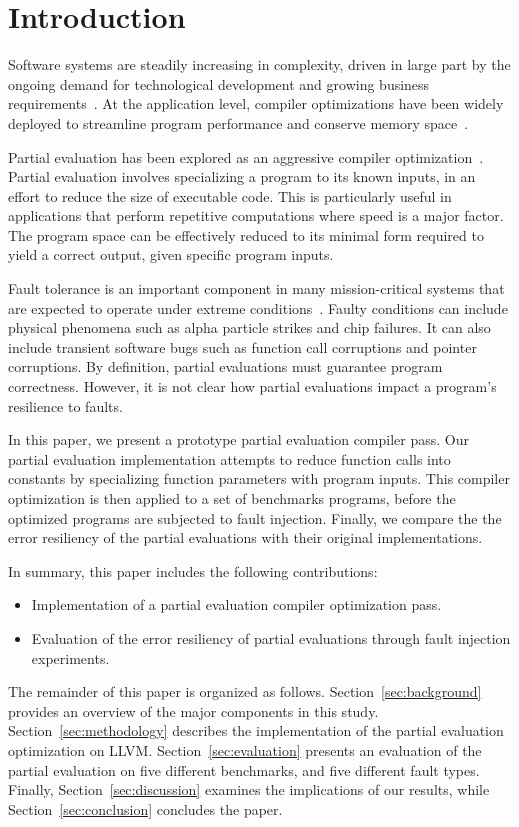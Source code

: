 \section{Introduction}

Software systems are steadily increasing in complexity, driven in large part by the ongoing demand for technological development and growing business requirements~\cite{Lyu}. 
At the application level, compiler optimizations have been widely deployed to streamline program performance and conserve memory space~\cite{Zhou}.

Partial evaluation has been explored as an aggressive compiler optimization~\cite{Jones1993}.
Partial evaluation involves specializing a program to its known inputs, in an effort to reduce the size of executable code. 
This is particularly useful in applications that perform repetitive computations where speed is a major factor.  
The program space can be effectively reduced to its minimal form required to yield a correct output, given specific program inputs.

Fault tolerance is an important component in many mission-critical systems that are expected to operate under extreme conditions~\cite{Somani}.
Faulty conditions can include physical phenomena such as alpha particle strikes and chip failures.
It can also include transient software bugs such as function call corruptions and pointer corruptions. 
By definition, partial evaluations must guarantee program correctness.
However, it is not clear how partial evaluations impact a program's resilience to faults.

In this paper, we present a prototype partial evaluation compiler pass.
Our partial evaluation implementation attempts to reduce function calls into constants by specializing function parameters with program inputs.
This compiler optimization is then applied to a set of benchmarks programs, before the optimized programs are subjected to fault injection.
Finally, we compare the the error resiliency of the partial evaluations with their original implementations.

In summary, this paper includes the following contributions:
\begin{itemize}
\item Implementation of a partial evaluation compiler optimization pass. 
\item Evaluation of the error resiliency of partial evaluations through fault injection experiments.
\end{itemize}

The remainder of this paper is organized as follows.
Section~\ref{sec:background} provides an overview of the major components in this study.
Section~\ref{sec:methodology} describes the implementation of the partial evaluation optimization on LLVM.
Section~\ref{sec:evaluation} presents an evaluation of the partial evaluation on five different benchmarks, and five different fault types.
Finally, Section~\ref{sec:discussion} examines the implications of our results, while Section~\ref{sec:conclusion} concludes the paper.
